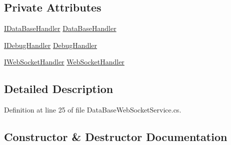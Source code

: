 \subsection*{Private Attributes}
\begin{DoxyCompactItemize}
\item 
\mbox{\hyperlink{interface_little_weeb_library_1_1_handlers_1_1_i_data_base_handler}{I\+Data\+Base\+Handler}} \mbox{\hyperlink{class_little_weeb_library_1_1_services_1_1_data_base_web_socket_service_a67887b9141e4bb47fd92c95b3ac89fd6}{Data\+Base\+Handler}}
\item 
\mbox{\hyperlink{interface_little_weeb_library_1_1_handlers_1_1_i_debug_handler}{I\+Debug\+Handler}} \mbox{\hyperlink{class_little_weeb_library_1_1_services_1_1_data_base_web_socket_service_a6ad3d83d94358db7e6bee7e31f97899a}{Debug\+Handler}}
\item 
\mbox{\hyperlink{interface_little_weeb_library_1_1_handlers_1_1_i_web_socket_handler}{I\+Web\+Socket\+Handler}} \mbox{\hyperlink{class_little_weeb_library_1_1_services_1_1_data_base_web_socket_service_a9bfc017139f9970e762b485277912a0e}{Web\+Socket\+Handler}}
\end{DoxyCompactItemize}


\subsection{Detailed Description}


Definition at line 25 of file Data\+Base\+Web\+Socket\+Service.\+cs.



\subsection{Constructor \& Destructor Documentation}
\mbox{\label{class_little_weeb_library_1_1_services_1_1_data_base_web_socket_service_a052238e0026967e104db0c6723923c7b}} 

